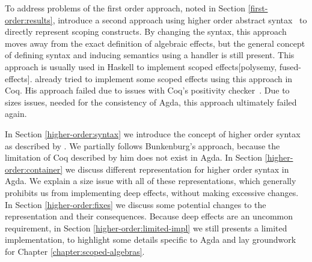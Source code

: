 
To address problems of the first order approach, noted in Section
\ref{first-order:results}, \citeauthor{DBLP:conf/haskell/WuSH14} introduce a
second approach using higher order abstract
syntax~\cite{DBLP:conf/haskell/WuSH14} to directly represent scoping
constructs.
By changing the syntax, this approach moves away from the exact definition of
algebraic effects, but the general concept of defining syntax and inducing
semantics using a handler is still present.
This approach is usually used in Haskell to implement scoped effects[polysemy,
fused-effects].
\citeauthor{bunkenburg2019modeling} already tried to implement some scoped
effects using this approach in Coq.
His approach failed due to issues with Coq's positivity
checker~\cite{bunkenburg2019modeling}.
Due to sizes issues, needed for the consistency of Agda, this approach
ultimately failed again.

In Section \ref{higher-order:syntax} we introduce the concept of higher order
syntax as described by \textcite{DBLP:conf/haskell/WuSH14}.
We partially follows Bunkenburg's approach, because the limitation of Coq
described by him does not exist in Agda.
In Section \ref{higher-order:container} we discuss different
representation for higher order syntax in Agda.
We explain a size issue with all of these representations, which generally
prohibits us from implementing deep effects, without making excessive changes.
In Section \ref{higher-order:fixes} we discuss some potential changes to the
representation and their consequences.
Because deep effects are an uncommon requirement, in Section
\ref{higher-order:limited-impl} we still presents a limited implementation,
to highlight some details specific to Agda and lay groundwork for Chapter
\ref{chapter:scoped-algebras}.


